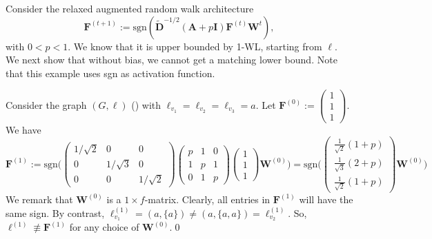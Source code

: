 \begin{example}
	Consider the relaxed augmented random walk architecture
$$\mathbf{F}^{(t+1)}:=\text{sgn}(\tilde{\mathbf{D}}^{-1/2}(\mathbf{A}+p\mathbf{I})\mathbf{F}^{(t)}\mathbf{W}^{t}),
$$
with $0<p<1$. We know that it is upper bounded by 1-WL, starting from $\pmb{\ell}$. We next show that without bias, we cannot get a matching lower bound. Note that this example uses sgn as activation function.

Consider the graph  $(G,\pmb{\ell})$
() with $\pmb{\ell}_{v_1}=\pmb{\ell}_{v_2}=\pmb{\ell}_{v_3}=a$. Let $\mathbf{F}^{(0)}:=\left(\begin{smallmatrix} 1\\1\\1\end{smallmatrix}\right)$.
We have 
$$
\mathbf{F}^{(1)}:=\text{sgn}\Biggl(
\begin{pmatrix}
1/\sqrt{2} & 0 & 0\\
0 & 1/\sqrt{3} & 0\\
0 & 0 & 1/\sqrt{2}
\end{pmatrix}
\begin{pmatrix}
p & 1 & 0\\
1 & p & 1\\
0 & 1 & p
\end{pmatrix}
\begin{pmatrix}
	1\\
	1\\
	1
	\end{pmatrix}\mathbf{W}^{(0)}\Biggr)
=\text{sgn}\Biggl(
\begin{pmatrix}
\frac{1}{\sqrt{2}}(1+p)\\
\frac{1}{\sqrt{3}}(2+p)\\
\frac{1}{\sqrt{2}}(1+p)\end{pmatrix}
\mathbf{W}^{(0)}
\Biggr)
$$
We remark that $\mathbf{W}^{(0)}$ is a $1\times f$-matrix. Clearly, all entries in
$\mathbf{F}^{(1)}$ will have the same sign. By contrast, $\pmb{\ell}^{(1)}_{v_1}=(a,\{a\})\neq
(a,\{a,a\})=\pmb{\ell}^{(1)}_{v_2}$. So, $\pmb{\ell}^{(1)}\not\equiv\mathbf{F}^{(1)}$ for any choice of $\mathbf{W}^{(0)}$.\qed
\end{example}

